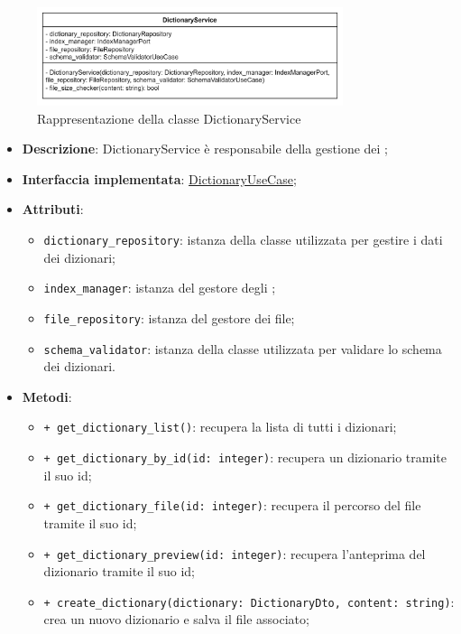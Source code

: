  \label{DictionaryService}
\begin{figure}[H]
    \centering
    \includegraphics[width=0.8\textwidth]{assets/Backend/dictionary_service.png}
    \caption{Rappresentazione della classe DictionaryService}
  \end{figure}
\begin{itemize}
    \item \textbf{Descrizione}: DictionaryService è responsabile della gestione dei ;
    \item \textbf{Interfaccia implementata}: \hyperref[DictionaryUseCase]{DictionaryUseCase};
    \item \textbf{Attributi}:
    \begin{itemize}
        \item \texttt{dictionary\_repository}: istanza della classe utilizzata per gestire i dati dei dizionari;
        \item \texttt{index\_manager}: istanza del gestore degli ;
        \item \texttt{file\_repository}: istanza del gestore dei file;
        \item \texttt{schema\_validator}: istanza della classe utilizzata per validare lo schema dei dizionari.
    \end{itemize}
    \item \textbf{Metodi}:
    \begin{itemize}
        \item \texttt{+ get\_dictionary\_list()}: recupera la lista di tutti i dizionari;
        \item \texttt{+ get\_dictionary\_by\_id(id: integer)}: recupera un dizionario tramite il suo id;
        \item \texttt{+ get\_dictionary\_file(id: integer)}: recupera il percorso del file tramite il suo id;
        \item \texttt{+ get\_dictionary\_preview(id: integer)}: recupera l'anteprima del dizionario tramite il suo id;
        \item \texttt{+ create\_dictionary(dictionary: DictionaryDto, content: string)}: crea un nuovo dizionario e salva il file associato;

\end{itemize}
\end{itemize}
